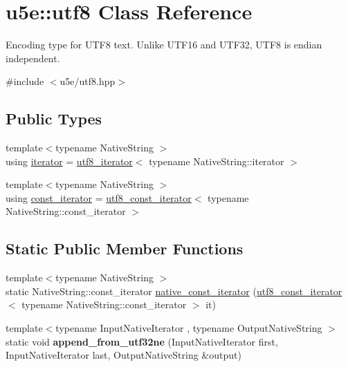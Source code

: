 \hypertarget{classu5e_1_1utf8}{}\section{u5e\+:\+:utf8 Class Reference}
\label{classu5e_1_1utf8}


Encoding type for U\+T\+F8 text. Unlike U\+T\+F16 and U\+T\+F32, U\+T\+F8 is endian independent.  




{\ttfamily \#include $<$u5e/utf8.\+hpp$>$}

\subsection*{Public Types}
\begin{DoxyCompactItemize}
\item 
{\footnotesize template$<$typename Native\+String $>$ }\\using \hyperlink{classu5e_1_1utf8_a4a1112036dbaf999d2c7752ac7536ea0}{iterator} = \hyperlink{classu5e_1_1utf8__iterator}{utf8\+\_\+iterator}$<$ typename Native\+String\+::iterator $>$
\item 
{\footnotesize template$<$typename Native\+String $>$ }\\using \hyperlink{classu5e_1_1utf8_a0a0e49f87a51183640beb235c89fd996}{const\+\_\+iterator} = \hyperlink{classu5e_1_1utf8__const__iterator}{utf8\+\_\+const\+\_\+iterator}$<$ typename Native\+String\+::const\+\_\+iterator $>$
\end{DoxyCompactItemize}
\subsection*{Static Public Member Functions}
\begin{DoxyCompactItemize}
\item 
{\footnotesize template$<$typename Native\+String $>$ }\\static Native\+String\+::const\+\_\+iterator \hyperlink{classu5e_1_1utf8_a96aee1a73b68ed1396bf12b469093942}{native\+\_\+const\+\_\+iterator} (\hyperlink{classu5e_1_1utf8__const__iterator}{utf8\+\_\+const\+\_\+iterator}$<$ typename Native\+String\+::const\+\_\+iterator $>$ it)
\item 
{\footnotesize template$<$typename Input\+Native\+Iterator , typename Output\+Native\+String $>$ }\\static void {\bfseries append\+\_\+from\+\_\+utf32ne} (Input\+Native\+Iterator first, Input\+Native\+Iterator last, Output\+Native\+String \&output)\hypertarget{classu5e_1_1utf8_a3b756c2ac9c47477f2cbe89311d559a9}{}\label{classu5e_1_1utf8_a3b756c2ac9c47477f2cbe89311d559a9}

\end{DoxyCompactItemize}


